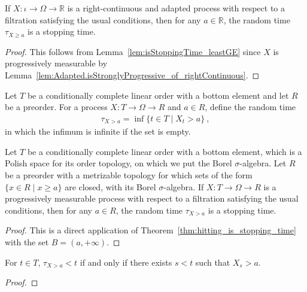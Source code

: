 \begin{corollary}\label{cor:isStoppingTime_leastGE_of_rightContinuous}
If $X : ι \to Ω \to ℝ$ is a right-continuous and adapted process with respect to a filtration satisfying the usual conditions, then for any $a \in \mathbb{R}$, the random time $\tau_{X \ge a}$ is a stopping time.
\end{corollary}

\begin{proof}
This follows from Lemma~\ref{lem:isStoppingTime_leastGE} since $X$ is progressively measurable by Lemma~\ref{lem:Adapted.isStronglyProgressive_of_rightContinuous}.
\end{proof}


\begin{definition}\label{def:leastGT}
  \mathlibok
Let $T$ be a conditionally complete linear order with a bottom element and let $R$ be a preorder.
For a process $X : T \to Ω \to R$ and $a \in R$, define the random time
\begin{align*}
  \tau_{X > a} = \inf\{t \in T \mid X_t > a\} \: ,
\end{align*}
in which the infimum is infinite if the set is empty.
\end{definition}


\begin{lemma}\label{lem:isStoppingTime_leastGT}
  \leanok
Let $T$ be a conditionally complete linear order with a bottom element, which is a Polish space for its order topology, on which we put the Borel $\sigma$-algebra.
Let $R$ be a preorder with a metrizable topology for which sets of the form $\{x \in R \mid x \ge a\}$ are closed, with its Borel $\sigma$-algebra.
If $X : T \to Ω \to R$ is a progressively measurable process with respect to a filtration satisfying the usual conditions, then for any $a \in R$, the random time $\tau_{X > a}$ is a stopping time.
\end{lemma}

\begin{proof}\leanok
This is a direct application of Theorem~\ref{thm:hitting_is_stopping_time} with the set $B = (a, +\infty)$.
\end{proof}


\begin{lemma}\label{lem:leastGT_lt_iff}
  \mathlibok
For $t \in T$, $\tau_{X > a} < t$ if and only if there exists $s < t$ such that $X_s > a$.
\end{lemma}

\begin{proof}\mathlibok

\end{proof}
